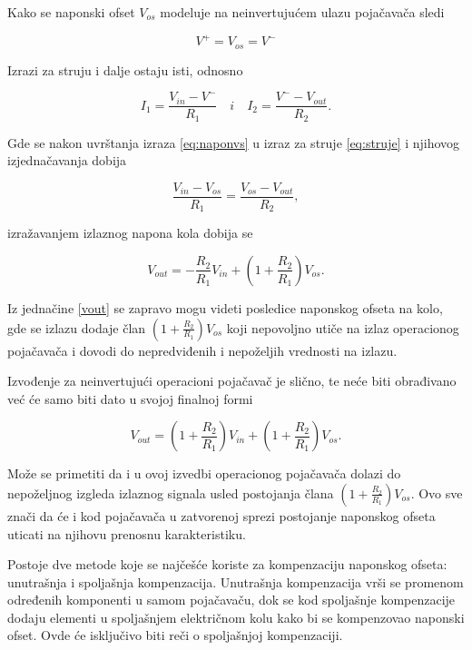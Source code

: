 {Kako se naponski ofset $V_{os}$ modeluje na neinvertujućem ulazu pojačavača sledi}

\begin{equation}
    V^+ = V_{os} = V^-
    \label{eq:naponvs}
\end{equation}

{Izrazi za struju i dalje ostaju isti, odnosno}

\begin{equation}
    I_1 = \frac{V_{in} - V^-}{R_1} \quad i \quad I_2 = \frac{V^- - V_{out}}{R_2}.
    \label{eq:struje}
\end{equation}

{Gde se nakon uvrštanja izraza \ref{eq:naponvs} u izraz za struje \ref{eq:struje} i njihovog izjednačavanja dobija}

\begin{equation}
    \frac{V_{in} - V_{os}}{R_1} = \frac{V_{os} - V_{out}}{R_2},
\end{equation}

{izražavanjem izlaznog napona kola dobija se}

\begin{equation}
    \boxed{V_{out} = - \frac{R_2}{R_1} V_{in} + (1 + \frac{R_2}{R_1}) V_{os}}.
    \label{vout}
\end{equation}

{Iz jednačine \ref{vout} se zapravo mogu videti posledice naponskog ofseta na kolo, gde se izlazu dodaje član $(1 + \frac{R_2}{R_1})V_{os}$ koji nepovoljno utiče na izlaz operacionog pojačavača i dovodi do nepredviđenih i nepoželjih vrednosti na izlazu.}

{Izvođenje za neinvertujući operacioni pojačavač je slično, te neće biti obrađivano već će samo biti dato u svojoj finalnoj formi}

\begin{equation}
    \boxed{V_{out} = (1 + \frac{R_2}{R_1})V_{in} + (1 + \frac{R_2}{R_1})V_{os}}.
\end{equation}

{Može se primetiti da i u ovoj izvedbi operacionog pojačavača dolazi do nepoželjnog izgleda izlaznog signala usled postojanja člana $(1 + \frac{R_2}{R_1})V_{os}$. Ovo sve znači da će i kod pojačavača u zatvorenoj sprezi postojanje naponskog ofseta uticati na njihovu prenosnu karakteristiku.}

{Postoje dve metode koje se najčešće koriste za kompenzaciju naponskog ofseta: unutrašnja i spoljašnja kompenzacija. Unutrašnja kompenzacija vrši se promenom određenih komponenti u samom pojačavaču, dok se kod spoljašnje kompenzacije dodaju elementi u spoljašnjem električnom kolu kako bi se kompenzovao naponski ofset. Ovde će isključivo biti reči o spoljašnjoj kompenzaciji.}

